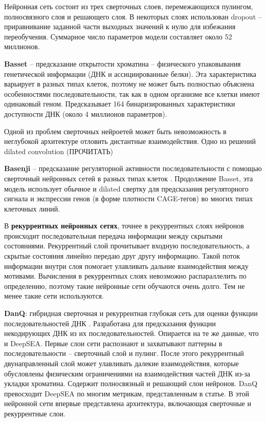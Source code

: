 Нейронная сеть состоит из трех сверточных слоев, перемежающихся пулингом, полносвязного слоя и решающего слоя. В некоторых слоях использован dropout -- приравнивание заданной части выходных значений к нулю для избежания переобучения.
Суммарное число параметров модели составляет около 52 миллионов.



{\bfseries Basset} -- предсказание открытости хроматина -- физического упаковывания генетической информации (ДНК и ассициированные белки). Эта характеристика варьирует в разных типах клеток, поэтому не может быть полностью объяснена особенностями последовательности, так как в одном организме все клетки имеют одинаковый геном.
Предсказывает 164 бинаризированных характеристики доступности ДНК (около 4 миллионов параметров).



Одной из проблем сверточных нейроетей может быть невозможность в неглубокой архитектуре отловить дистантные взаимодействия. Одно из решений dilated convolution (ПРОЧИТАТЬ)


{\bfseries Basenji} – предсказание регуляторной активности последовательности с помощью сверточный нейронных сетей в разных типах клеток \cite{kelley_sequential_2017}. 
Продолжение Basset, эта модель использует обычное и dilated свертку для предсказания регуляторного сигнала и экспрессии генов (в форме плотности CAGE-тегов) во многих типах клеточных линий.


В {\bfseries рекуррентных нейронных сетях}, точнее в рекуррентных слоях нейронов происходит последовательная передача информации между скрытыми состояниями. Рекуррентный слой прочитывает входную последовательность, а скрытые состояния линейно передаю друг другу информацию.
Такой поток информации внутри слоя помогает улавливать дальние взаимодействия между мотивами.
Вычисления в рекуррентных слоях невозможно распараллелить по определению, поэтому такие нейронные сети обучаются очень долго. Тем не менее такие сети используются.

{\bfseries DanQ}: гибридная сверточная и рекуррентная глубокая сеть для оценки функции последовательностей  ДНК \cite{quang_danq:_2016}. 
Разработана для предсказания функции некодирующих ДНК из их последовательностей. Опирается на те же данные, что и DeepSEA.
Первые слои сети распознают и захватывают паттерны в последовательности -- сверточный слой и пулинг. После этого рекуррентный двунаправленный слой может улавливать далекие взаимодействия, которые обусловлены физическим ограничениями на взаимодействия частей ДНК из-за укладки хроматина. Содержит полносвязный и решающий слои нейронов.
DanQ превосходит DeepSEA по многим метрикам, представленным в статье. В этой нейронной сети впервые представлена архитектура, включающая сверточные и рекуррентные слои.

